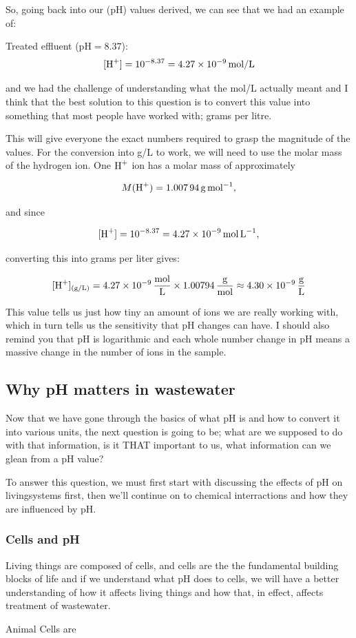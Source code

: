 So, going back into our (\(\mathrm{pH}\)) values derived, we can see that we had an example of:

Treated effluent (\(\mathrm{pH}=8.37\)):
  \[
    [\ce{H+}] = 10^{-8.37} = \SI{4.27e-9}{mol/L}
  \]

and we had the challenge of understanding what the mol/L actually meant and I think that the best solution to this question is to convert this value into something that most people have worked with; grams per litre.

This will give everyone the exact numbers required to grasp the magnitude of the values. For the conversion into g/L to work, we will need to use the molar mass of the hydrogen ion. One \(\ce{H+}\) ion has a molar mass of approximately

\[
M(\ce{H+}) = \SI{1.00794}{\gram\per\mole},
\]

and since

\[
[\ce{H+}] = 10^{-8.37} = \SI{4.27e-9}{\mol\per\liter},
\]

converting this into grams per liter gives:

\[
[\ce{H+}]_{\text{(g/L)}} = 
4.27 \times 10^{-9}\,\frac{\mathrm{mol}}{\mathrm{L}} \times
1.00794\,\frac{\mathrm{g}}{\mathrm{mol}}
 \approx 4.30 \times 10^{-9}\,\frac{\mathrm{g}}{\mathrm{L}}
\]

This value tells us just how tiny an amount of  ions we are really working with, which in turn tells us the sensitivity that pH changes can have. I should also remind you that pH is logarithmic and each whole number change in pH means a massive change in the number of ions in the sample.

\subsection{Why pH matters in wastewater}
Now that we have gone through the basics of what pH is and how to convert it into various units, the next question is going to be; what are we supposed to do with that information, is it THAT important to us, what information can we glean from a pH value?

To answer this question, we must first start with discussing the effects of pH on \gls{livingsystems} first, then we'll continue on to chemical interractions and how they are influenced by pH.

\subsubsection{Cells and pH}

Living things are composed of cells, and cells are the the fundamental building blocks of life and if we understand what pH does to cells, we will have a better understanding of how it affects living things and how that, in effect, affects treatment of wastewater.

Animal Cells are